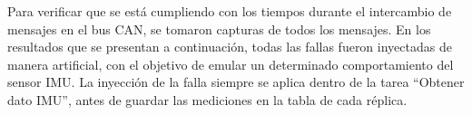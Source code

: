 



Para verificar que se está cumpliendo con los tiempos durante el intercambio de mensajes en el bus CAN, se tomaron capturas de todos los mensajes. En los resultados que se presentan a continuación, todas las fallas fueron inyectadas de manera artificial, con el objetivo de emular un determinado comportamiento del sensor IMU. La inyección de la falla siempre se aplica dentro de la tarea ``Obtener dato IMU'', antes de guardar las mediciones en la tabla de cada réplica.


